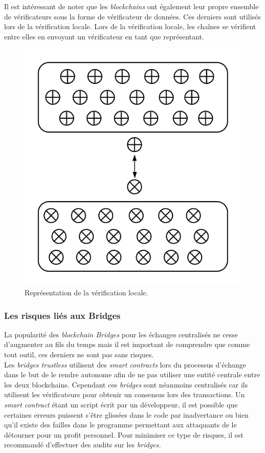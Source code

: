\pagebreak
Il est intéressant de noter que les \textit{\gls{blockchain}s} ont également leur propre ensemble de vérificateurs sous la forme de vérificateur de données. Ces derniers sont utilisés lors de la vérification locale. Lors de la vérification locale, les chaînes se vérifient entre elles en envoyant un vérificateur en tant que représentant.

\begin{figure}[h]
    \centering
\includegraphics[scale=0.70]{centralisation/imagesBridges/DiagrammeVerifLocale.png}
\caption{Représentation de la vérification locale.}
\label{fig:LocaleVerif}
\end{figure}

\subsubsection{Les risques liés aux Bridges}

La popularité des \textit{\gls{blockchain} Bridges} pour les échanges centralisés ne cesse d’augmenter au fils du temps mais il est important de comprendre que comme tout outil, ces derniers ne sont pas sans risques. \\

Les \textit{bridges trustless} utilisent des \textit{\gls{smart contract}s} lors du processus d’échange dans le but de le rendre autonome afin de ne pas utiliser une entité centrale entre les deux \gls{blockchain}s. Cependant ces \textit{bridges} sont néanmoins centralisés car ils utilisent les vérificateurs pour obtenir un consensus lors des transactions.
Un \textit{\gls{smart contract}} étant un script écrit par un développeur, il est possible que certaines erreurs puissent s’être glissées dans le code par inadvertance ou bien qu’il existe des failles dans le programme permettant aux attaquants de le détourner pour un profit personnel. 
Pour minimiser ce type de risques, il est recommandé d’effectuer des audits sur les \textit{bridges.} \\

